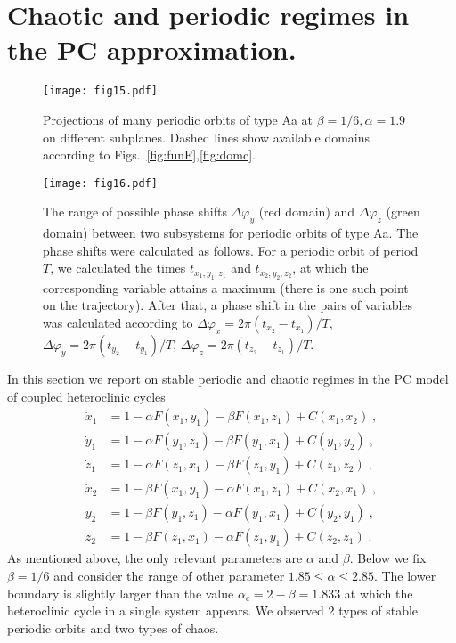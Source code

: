 \documentclass[3p,number,review,sort&compress]{elsarticle}
\newcommand{\AN}[1]{{\color{green}AN: #1}}
\begin{document}

\section{Chaotic and periodic regimes in 
the PC 
approximation.}
\label{sec:plach}

\begin{figure}[!htb]
\centering
\texttt{[image: fig15.pdf]}
\caption{Projections of many periodic orbits of type Aa at $\beta=1/6,\alpha=1.9$ on different subplanes. Dashed lines show available domains according to Figs.~\ref{fig:funF},\ref{fig:domc}.}
\label{fig:poa190}
\end{figure}

\begin{figure}[!htb]
\centering
\texttt{[image: fig16.pdf]}
\caption{The range of possible phase shifts $\Delta\varphi_y$ (red domain)
and $\Delta\varphi_z$ (green domain) between two subsystems for periodic orbits of type Aa. The phase shifts were calculated as follows. 
For a periodic orbit of period $T$, we calculated the times $t_{x_1,y_1,z_1}$ and $t_{x_2,y_2,z_2}$, at which the corresponding variable attains 
a maximum (there is one such point on the trajectory). After that, a phase shift in the pairs of variables was calculated
according to 
$
\Delta\varphi_x=2\pi(t_{x_2}-t_{x_1})/T$, $\Delta\varphi_y=2\pi (t_{y_2}-t_{y_1})/T$, $\Delta\varphi_z=2\pi (t_{z_2}-t_{z_1})/T$.
}
\label{fig:phsh}
\end{figure}

In this section we report on stable periodic and chaotic regimes in the PC model
of coupled heteroclinic cycles
\begin{equation}
\begin{aligned}
\dot x_1 &=1-\alpha F(x_1,y_1) -\beta F(x_1,z_1)+C(x_1,x_2)\;,\\
\dot y_1&=1-\alpha F(y_1,z_1)-\beta F(y_1,x_1)+C(y_1,y_2)\;,\\
\dot z_1&=1-\alpha F(z_1,x_1)-\beta F(z_1,y_1)+C(z_1,z_2)\;,\\
\dot x_2 &=1-\beta F(x_1,y_1) -\alpha F(x_1,z_1)+C(x_2,x_1)\;,\\
\dot y_2&=1-\beta F(y_1,z_1)-\alpha F(y_1,x_1)+C(y_2,y_1)\;,\\
\dot z_2&=1-\beta F(z_1,x_1)-\alpha F(z_1,y_1)+C(z_2,z_1)\;.
\end{aligned}
\label{eq:cPC}
\end{equation}
As mentioned above, the only relevant parameters are $\alpha$ and $\beta$. Below we 
fix $\beta=1/6$ and consider the range of other parameter $1.85\leq \alpha \leq 2.85$. The lower boundary is slightly larger than the value $\alpha_c=2-\beta=1.833$
at which the heteroclinic cycle in a single system appears. We observed 2 types of stable periodic orbits and two types of chaos.
\end{document}
